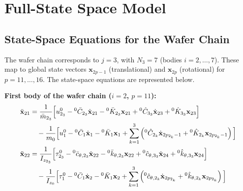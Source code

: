 \def\baselinestretch{1}
\chapter{Full-State Space Model}\label{ch:appendix_state_space}

\def\baselinestretch{1.66}

\section{State-Space Equations for the Wafer Chain}\label{sec:appendix_wafer_chain}

The wafer chain corresponds to $j=3$, with $N_3=7$ (bodies $i=2, \ldots, 7$). These map to global state vectors $\mathbf{x}_{2p-1}$ (translational) and $\mathbf{x}_{2p}$ (rotational) for $p=11, \ldots, 16$. The state-space equations are represented below.

\textbf{First body of the wafer chain ($i=2$, $p=11$):}
\begin{align}
    \ddot{\mathbf{x}}_{21} &=
    \frac{1}{\bar{m}_{2_3}} \Big[ u^0_{2_3} - {}^0\bar{C}_{2_3}\dot{\mathbf{x}}_{21} - {}^0\bar{K}_{2_3}\mathbf{x}_{21} + {}^0\hat{C}_{3_3}\dot{\mathbf{x}}_{23} + {}^0\hat{K}_{3_3}\mathbf{x}_{23} \Big] \notag \\
    &\quad - \frac{1}{m_0} \Big[ u^0_1 - {}^0\bar{C}_1\dot{\mathbf{x}}_{1} - {}^0\bar{K}_1 \mathbf{x}_{1} + \sum_{k=1}^3 \left( {}^0\hat{C}_{2_k}\dot{\mathbf{x}}_{2p_{2_k}-1} + {}^0\hat{K}_{2_k}\mathbf{x}_{2p_{2_k}-1} \right) \Big] \\
    \ddot{\mathbf{x}}_{22} &=
    \frac{1}{I_{z_{2_3}}} \Big[ \tau^0_{2_3} - {}^0\bar{c}_{\theta,2_3}\dot{\mathbf{x}}_{22} - {}^0\bar{k}_{\theta,2_3}\mathbf{x}_{22} + {}^0\hat{c}_{\theta,3_3}\dot{\mathbf{x}}_{24} + {}^0\hat{k}_{\theta,3_3}\mathbf{x}_{24} \Big] \notag \\
    &\quad - \frac{1}{I_{z_0}} \Big[ \tau^0_1 - {}^0\bar{C}_1\dot{\mathbf{x}}_{2} - {}^0\bar{K}_1 \mathbf{x}_{2} + \sum_{k=1}^3 \left( {}^0\hat{c}_{\theta,2_k}\dot{\mathbf{x}}_{2p_{2_k}} + {}^0\hat{k}_{\theta,2_k}\mathbf{x}_{2p_{2_k}} \right) \Big]
\end{align}

